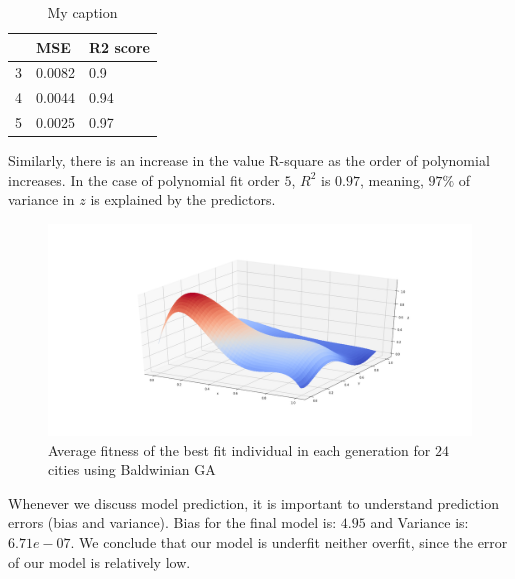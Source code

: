 \documentclass [11pt]{article}
\begin{document}
\begin{table}[H]
\centering
\begin{tabular}{lll}
\hline
  & MSE    & R2 score \\ \hline
3 & 0.0082 & 0.9      \\
4 & 0.0044 & 0.94     \\
5 & 0.0025 & 0.97     \\ \hline
\end{tabular}%
\caption{My caption}
\label{tab:olsFranke}
\end{table}
Similarly, there is an increase in the value R-square as the order of polynomial increases. In the case of polynomial fit order $5$, $R^{2}$ is $0.97$, meaning, $97\%$ of variance in $z$ is explained by the predictors. 
\begin{figure}[H]
\centering
\includegraphics[width=1\textwidth]{figures/olsFranke.png}
        \caption{Average fitness of the best fit individual in each generation for $24$ cities using Baldwinian GA}
        \label{fig:olsFranke}
\end{figure}
Whenever we discuss model prediction, it is important to understand prediction errors (bias and variance). Bias for the final model is: $4.95$ and Variance is: $6.71e-07$. We conclude that our model is underfit neither overfit, since the error of our model is relatively low.
\end{document}
